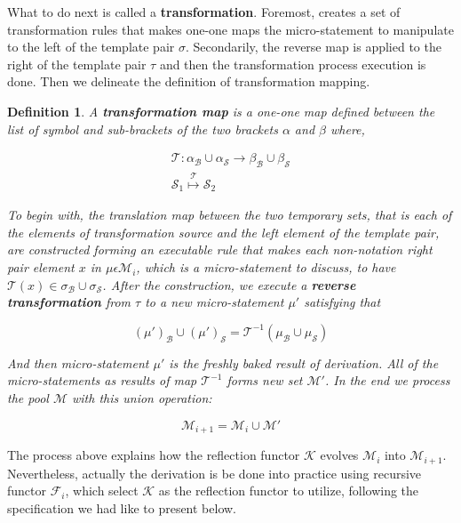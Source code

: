 \documentclass{aims}
\newtheorem{definition}{Definition}	%
\numberwithin{theorem}{section}	%
\numberwithin{axiom}{section}	%
\numberwithin{definition}{section}	%
\begin{document}
What to do next is called a \textbf{ transformation}. Foremost, creates a set of transformation rules that makes one-one maps the micro-statement to manipulate to the left of the template pair \(\sigma\). Secondarily, the reverse map is applied to the right of the template pair \(\tau\) and then the transformation process execution is done. Then we delineate the definition of { }transformation mapping.

\begin{definition}
	A \textbf{ transformation map} is a one-one map defined between the list of symbol and sub-brackets of the two brackets \(\alpha\) and \(\beta\) where,
	
	\begin{equation}
		\begin{gathered}
			\mathcal{T}:\alpha _{\mathcal{B}}\cup \alpha _{\mathcal{S}}\to \beta _{\mathcal{B}}\cup \beta _{\mathcal{S}}\\
			\mathcal{S}_1\overset{\mathcal{T}}{\mapsto }\mathcal{S}_2
		\end{gathered}
	\end{equation}
	
	To begin with, the translation map between the two temporary sets, that is each of the elements of transformation source and the left element of the template pair, are constructed forming an executable rule that makes each non-notation right pair element \(x\) in \(\mu \epsilon \mathcal{M}_i\), which is a micro-statement to discuss, to have \(\mathcal{T}(x)\in \sigma _{\mathcal{B}}\cup \sigma _{\mathcal{S}}\). After the construction, we execute a \textbf{ reverse transformation } from \(\tau\) to a new micro-statement \(\mu '\) satisfying that
	
	\begin{equation}
		(\mu ')_{\mathcal{B}}\cup (\mu ')_{\mathcal{S}} =\mathcal{T}^{-1}\left(\mu _{\mathcal{B}}\cup \mu _{\mathcal{S}}\right)
	\end{equation}
	
	And then micro-statement \(\mu '\) is the freshly baked result of derivation. All of the micro-statements as results of map \(\mathcal{T}^{-1}\) forms new set \(\mathcal{M}'\). In the end we process the pool \(\mathcal{M}\) with this union operation:
	
	\[\mathcal{M}_{i+1}=\mathcal{M}_i\cup \mathcal{M}'\]
\end{definition}

The process above explains how the reflection functor \(\mathcal{K}\) evolves \(\mathcal{M}_i\) into \(\mathcal{M}_{i+1}\). Nevertheless, actually the derivation is be done into practice using recursive functor \(\mathcal{F}_i\), which select \(\mathcal{K}\) as the reflection functor to utilize, following the specification we had like to present below.
\end{document}
